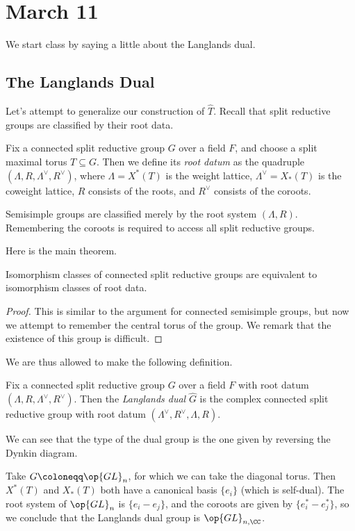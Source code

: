 \documentclass[../notes.tex]{subfiles}
\begin{document}
\section{March 11}
We start class by saying a little about the Langlands dual.

\subsection{The Langlands Dual}
Let's attempt to generalize our construction of $\widehat T$. Recall that split reductive groups are classified by their root data.
\begin{definition}
	Fix a connected split reductive group $G$ over a field $F$, and choose a split maximal torus $T\subseteq G$. Then we define its \textit{root datum} as the quadruple $(\Lambda,R,\Lambda^\lor,R^\lor)$, where $\Lambda=X^*(T)$ is the weight lattice, $\Lambda^\lor=X_*(T)$ is the coweight lattice, $R$ consists of the roots, and $R^\lor$ consists of the coroots.
\end{definition}
\begin{remark}
	Semisimple groups are classified merely by the root system $(\Lambda,R)$. Remembering the coroots is required to access all split reductive groups.
\end{remark}
Here is the main theorem.
\begin{theorem} \label{thm:root-datum}
	Isomorphism classes of connected split reductive groups are equivalent to isomorphism classes of root data.
\end{theorem}
\begin{proof}
	This is similar to the argument for connected semisimple groups, but now we attempt to remember the central torus of the group. We remark that the existence of this group is difficult.
\end{proof}
We are thus allowed to make the following definition.
\begin{definition}
	Fix a connected split reductive group $G$ over a field $F$ with root datum $(\Lambda,R,\Lambda^\lor,R^\lor)$. Then the \textit{Langlands dual} $\widehat G$ is the complex connected split reductive group with root datum $(\Lambda^\lor,R^\lor,\Lambda,R)$.
\end{definition}
\begin{remark}
	We can see that the type of the dual group is the one given by reversing the Dynkin diagram.
\end{remark}
\begin{example}
	Take $G\coloneqq\op{GL}_n$, for which we can take the diagonal torus. Then $X^*(T)$ and $X_*(T)$ both have a canonical basis $\{e_i\}$ (which is self-dual). The root system of $\op{GL}_n$ is $\{e_i-e_j\}$, and the coroots are given by $\{e_i^*-e_j^*\}$, so we conclude that the Langlands dual group is $\op{GL}_{n,\CC}$.
\end{example}
\end{document}
